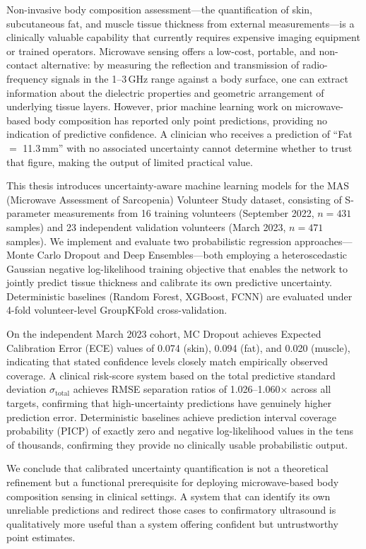 \documentclass[12pt, a4paper, oneside]{report}
\begin{document}
Non-invasive body composition assessment---the quantification of skin, subcutaneous fat, and muscle tissue thickness from external measurements---is a clinically valuable capability that currently requires expensive imaging equipment or trained operators. Microwave sensing offers a low-cost, portable, and non-contact alternative: by measuring the reflection and transmission of radio-frequency signals in the 1--3\,GHz range against a body surface, one can extract information about the dielectric properties and geometric arrangement of underlying tissue layers. However, prior machine learning work on microwave-based body composition has reported only point predictions, providing no indication of predictive confidence. A clinician who receives a prediction of ``Fat $=$ 11.3\,mm'' with no associated uncertainty cannot determine whether to trust that figure, making the output of limited practical value.

This thesis introduces uncertainty-aware machine learning models for the MAS (Microwave Assessment of Sarcopenia) Volunteer Study dataset, consisting of S-parameter measurements from 16 training volunteers (September 2022, $n=431$ samples) and 23 independent validation volunteers (March 2023, $n=471$ samples). We implement and evaluate two probabilistic regression approaches---Monte Carlo Dropout and Deep Ensembles---both employing a heteroscedastic Gaussian negative log-likelihood training objective that enables the network to jointly predict tissue thickness and calibrate its own predictive uncertainty. Deterministic baselines (Random Forest, XGBoost, FCNN) are evaluated under 4-fold volunteer-level GroupKFold cross-validation.

On the independent March 2023 cohort, MC Dropout achieves Expected Calibration Error (ECE) values of 0.074 (skin), 0.094 (fat), and 0.020 (muscle), indicating that stated confidence levels closely match empirically observed coverage. A clinical risk-score system based on the total predictive standard deviation $\sigma_{\mathrm{total}}$ achieves RMSE separation ratios of 1.026--1.060$\times$ across all targets, confirming that high-uncertainty predictions have genuinely higher prediction error. Deterministic baselines achieve prediction interval coverage probability (PICP) of exactly zero and negative log-likelihood values in the tens of thousands, confirming they provide no clinically usable probabilistic output.

We conclude that calibrated uncertainty quantification is not a theoretical refinement but a functional prerequisite for deploying microwave-based body composition sensing in clinical settings. A system that can identify its own unreliable predictions and redirect those cases to confirmatory ultrasound is qualitatively more useful than a system offering confident but untrustworthy point estimates.
\end{document}

